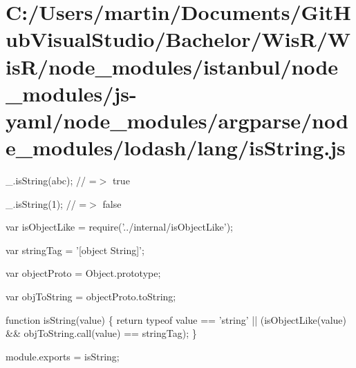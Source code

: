 \hypertarget{_c_1_2_users_2martin_2_documents_2_git_hub_visual_studio_2_bachelor_2_wis_r_2_wis_r_2node_moduleb9e394a74447fda6b76dee44118b971e}{}\section{C\+:/\+Users/martin/\+Documents/\+Git\+Hub\+Visual\+Studio/\+Bachelor/\+Wis\+R/\+Wis\+R/node\+\_\+modules/istanbul/node\+\_\+modules/js-\/yaml/node\+\_\+modules/argparse/node\+\_\+modules/lodash/lang/is\+String.\+js}
\+\_\+.\+is\+String(\textquotesingle{}abc\textquotesingle{}); // =$>$ true

\+\_\+.\+is\+String(1); // =$>$ false


\begin{DoxyCodeInclude}
var isObjectLike = require(\textcolor{stringliteral}{'../internal/isObjectLike'});

var stringTag = \textcolor{stringliteral}{'[object String]'};

var objectProto = Object.prototype;

var objToString = objectProto.toString;

\textcolor{keyword}{function} isString(value) \{
  \textcolor{keywordflow}{return} typeof value == \textcolor{stringliteral}{'string'} || (isObjectLike(value) && objToString.call(value) == stringTag);
\}

module.exports = isString;
\end{DoxyCodeInclude}
 